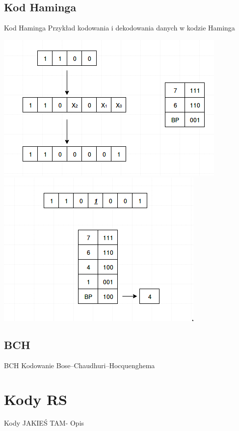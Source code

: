 \documentclass[12pt]{beamer}
\begin{document}
\subsection{Kod Haminga}
\begin{frame}{Kod Haminga}
Przykład kodowania i dekodowania danych w kodzie Haminga
\begin{center}
\includegraphics[scale= 0.30]{Haming/Kodowanie_Haming.png}
\includegraphics[scale=0.30]{Haming/Dekodowanie_Haming.png}
\end{center}
\end{frame}
\subsection{BCH}
\begin{frame}{BCH}
Kodowanie Bose–Chaudhuri–Hocquenghema

\end{frame}
	

\section{Kody RS}
\begin{frame}{Kody JAKIEŚ TAM- Opis}
\setcounter{section}{1}

\end{frame}
\end{document}
